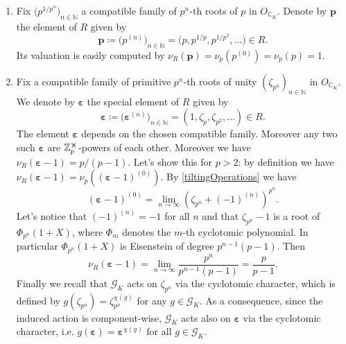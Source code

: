 \begin{ex}[]\leavevmode\vspace{-.2\baselineskip}\label{ExampleEltsTilt}
\begin{enumerate}
\item Fix $\big( p^{1/p^n} \big)_{n \in \mathbb{N}}$ 
	a compatible family of $p^n$-th roots of $p$
	in $O_{\mathbb{C}_K}$.
	Denote by $\mathbf{p}$ the element of $R$ given by
	\begin{equation*}
		\mathbf{p} \coloneqq \big( p^{(n)} \big)_{n \in \mathbb{N}} =
		\big( p, p^{1/p}, p^{1/p^2}, \ldots \big) \in R
	.\end{equation*}
	Its valuation is easily computed by
	$\nu_R(\mathbf{p}) = \nu_p(p^{(0)}) = \nu_p(p) = 1$.

\item Fix a compatible family of primitive $p^n$-th roots of unity
	$\left( \zeta_{p^n} \right)_{n \in \mathbb{N}}$ in $O_{\mathbb{C}_K}$.
	We denote by $\boldsymbol\varepsilon$ the special element of $R$ given by
	\begin{equation*}
		\boldsymbol\varepsilon \coloneqq \big( \boldsymbol\varepsilon^{(n)} \big)_{n \in \mathbb{N}} =
		\left( 1, \zeta_p, \zeta_{p^2}, \ldots \right) \in R
	.\end{equation*}
	The element $\boldsymbol\varepsilon$ depends on the chosen
	compatible family.
	Moreover any two such $\boldsymbol\varepsilon$
	are $\mathbb{Z}_{p}^{\cross}$-powers of each other.
	Moreover we have
	$\nu_R \left( \boldsymbol\varepsilon - 1 \right) = p/ (p - 1)$.
	Let's show this for $p > 2$: by definition we have
	$\nu_R(\boldsymbol\varepsilon - 1) = \nu_p \left( (\boldsymbol\varepsilon -1 )^{(0)} \right)$.
	By \cref{tiltingOperations} we have
	\begin{equation*}
		\left( \boldsymbol\varepsilon -1 \right)^{(0)} =
		\lim_{n \to \infty} \left( \zeta_{p^n} + (-1)^{(n)} \right)^{p^n}
	.\end{equation*}
	Let's notice that $\left( -1 \right)^{(n)} = -1$ for all $n$
	and that $\zeta_{p^n} - 1$ is a root of $\Phi_{p^n}(1+X)$,
	where $\Phi_m$ denotes the $m$-th cyclotomic polynomial.
	In particular $\Phi_{p^n}(1+X)$ is Eisenstein of degree
	$p^{n-1}(p-1)$.
	Then
	\begin{equation*}
		\nu_R(\boldsymbol\varepsilon - 1) =
		\lim_{n \to \infty} \frac{ p^n }{ p^{n-1}(p-1) } =
		\frac{ p }{ p-1 }
	.\end{equation*}
	Finally we recall that $\mathscr{G}_K$ acts on $\zeta_{p^n}$ via
	the cyclotomic character, which is defined by
	$g(\zeta_{p^n}) = \zeta_{p^n}^{\chi(g)}$ for any $g \in \mathscr{G}_K$.
	As a consequence, since the induced action is component-wise,
	$\mathscr{G}_K$ acts also on $\boldsymbol\varepsilon$ via the cyclotomic character,
	i.e. $g(\boldsymbol\varepsilon) = \boldsymbol\varepsilon^{\chi(g)}$
	for all $g \in \mathscr{G}_K$.
\end{enumerate}
\end{ex}


